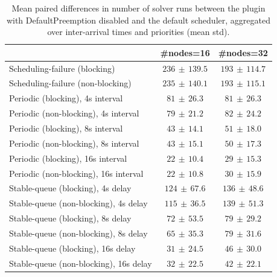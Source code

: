 \begin{table}[t]
\tiny
\setlength{\tabcolsep}{1.2pt}
\renewcommand{\arraystretch}{1.12}
\centering
\caption{Mean paired differences in number of solver runs between the plugin with DefaultPreemption disabled and the default scheduler, aggregated over inter-arrival times and priorities (mean \pm std).}
\label{tab:solver_runs-defpreempt0-std1-agg-arrival-prio}
\begin{tabular}{l c c}
\toprule
 & \#nodes=16 & \#nodes=32 \\
\midrule
Scheduling-failure (blocking) & $236\,\pm\,139.5$ & $193\,\pm\,114.7$ \\
Scheduling-failure (non-blocking) & $235\,\pm\,140.1$ & $193\,\pm\,115.1$ \\
Periodic (blocking), 4s interval & $81\,\pm\,26.3$ & $81\,\pm\,26.3$ \\
Periodic (non-blocking), 4s interval & $79\,\pm\,21.2$ & $82\,\pm\,24.2$ \\
Periodic (blocking), 8s interval & $43\,\pm\,14.1$ & $51\,\pm\,18.0$ \\
Periodic (non-blocking), 8s interval & $43\,\pm\,15.1$ & $50\,\pm\,17.3$ \\
Periodic (blocking), 16s interval & $22\,\pm\,10.4$ & $29\,\pm\,15.3$ \\
Periodic (non-blocking), 16s interval & $22\,\pm\,10.8$ & $30\,\pm\,15.9$ \\
Stable-queue (blocking), 4s delay & $124\,\pm\,67.6$ & $136\,\pm\,48.6$ \\
Stable-queue (non-blocking), 4s delay & $115\,\pm\,36.5$ & $139\,\pm\,51.3$ \\
Stable-queue (blocking), 8s delay & $72\,\pm\,53.5$ & $79\,\pm\,29.2$ \\
Stable-queue (non-blocking), 8s delay & $65\,\pm\,35.3$ & $79\,\pm\,31.6$ \\
Stable-queue (blocking), 16s delay & $31\,\pm\,24.5$ & $46\,\pm\,30.0$ \\
Stable-queue (non-blocking), 16s delay & $32\,\pm\,22.5$ & $42\,\pm\,22.1$ \\
\bottomrule
\end{tabular}
\end{table}
